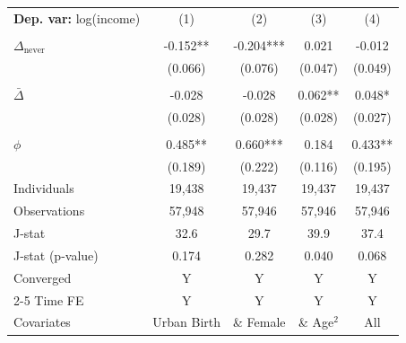 \begin{tabular}{l cccc} \toprule  \textbf{Dep. var:}  log(income) 
                    &\multicolumn{1}{c}{(1)}   &\multicolumn{1}{c}{(2)}   &\multicolumn{1}{c}{(3)}   &\multicolumn{1}{c}{(4)}   \\
                    &               &               &               &               \\
\addlinespace
$\Delta_{\text{never}}$&      -0.152** &      -0.204***&       0.021   &      -0.012   \\
                    &     (0.066)   &     (0.076)   &     (0.047)   &     (0.049)   \\
                    &               &               &               &               \\
\addlinespace
$\bar{\Delta}$      &      -0.028   &      -0.028   &       0.062** &       0.048*  \\
                    &     (0.028)   &     (0.028)   &     (0.028)   &     (0.027)   \\
                    &               &               &               &               \\
\addlinespace
$\phi$              &       0.485** &       0.660***&       0.184   &       0.433** \\
                    &     (0.189)   &     (0.222)   &     (0.116)   &     (0.195)   \\
\addlinespace
Individuals         &      19,438   &      19,437   &      19,437   &      19,437   \\
Observations        &      57,948   &      57,946   &      57,946   &      57,946   \\
J-stat              &        32.6   &        29.7   &        39.9   &        37.4   \\
J-stat (p-value)    &       0.174   &       0.282   &       0.040   &       0.068   \\
Converged           &           Y   &           Y   &           Y   &           Y   \\
\cmidrule{2-5} Time FE & Y & Y & Y & Y \\ Covariates & Urban Birth & \& Female & \& Age$^2$ & All \\ \bottomrule \end{tabular}
